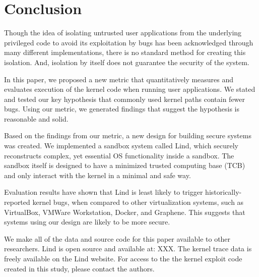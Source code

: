 \section{Conclusion}
\label{sec.conclusion}

Though the idea of isolating untrusted user applications from the underlying privileged code 
to avoid its exploitation by bugs has been acknowledged through many different implementations, 
there is no standard method for creating this isolation. 
And, isolation by itself does not guarantee the security of the system.

In this paper, we proposed a new metric that quantitatively measures and 
evaluates execution of the kernel code when running user applications. 
We stated and tested our key hypothesis that commonly used kernel paths contain fewer bugs. 
Using our metric, we generated findings that suggest the hypothesis is reasonable and solid.

Based on the findings from our metric, a new design for building secure systems was created. 
We implemented a sandbox system called Lind, which securely reconstructs complex, 
yet essential OS functionality inside a sandbox. The sandbox itself is designed to 
have a minimized trusted computing base (TCB) and only interact with the kernel in a minimal and safe way. 

Evaluation results have shown that Lind is least likely to trigger historically-reported kernel bugs, 
when compared to other virtualization systems, such as VirtualBox, VMWare Workstation, Docker, and Graphene. 
This suggests that systems using our design
are likely to be more secure.

We make all of the data and source code for this paper available to other 
researchers.  Lind is open source and available at: XXX.  The kernel 
trace data is freely available on the Lind website.  For access
to the the kernel exploit code created in this study, please contact the 
authors.


